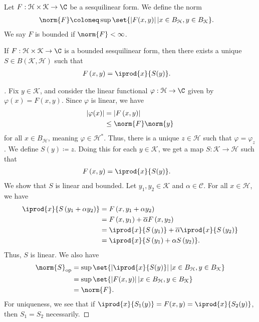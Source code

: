\documentclass[10pt]{mypackage}
\begin{document}
\begin{definition}
  Let $F: \mathcal{H}\times \mathcal{K}\rightarrow \C$ be a sesquilinear form. We define the norm
  \begin{align*}
    \norm{F} &\coloneq \sup\set{\left\vert F(x,y) \right\vert | x\in B_{\mathcal{H}},y\in B_{\mathcal{K}}}.
  \end{align*}
  We say $F$ is bounded if $\norm{F} < \infty $.
\end{definition}
\begin{proposition}
  If $F: \mathcal{H}\times \mathcal{K}\rightarrow \C$ is a bounded sesquilinear form, then there exists a unique $S\in B\left(\mathcal{K},\mathcal{H}\right)$ such that
  \begin{align*}
    F\left(x,y\right) &= \iprod{x}{S(y)}.
  \end{align*}
\end{proposition}
\begin{proof}[]
Fix $y\in \mathcal{K}$, and consider the linear functional $\varphi: \mathcal{H}\rightarrow \C$ given by $\varphi(x) = F\left(x,y\right)$. Since $\varphi$ is linear, we have
\begin{align*}
  \left\vert \varphi(x) \right\vert &= \left\vert F\left(x,y\right) \right\vert\\
                                    &\leq \norm{F}\norm{y}
\end{align*}
for all $x\in B_{\mathcal{H}}$, meaning $\varphi\in \mathcal{H}^{\ast}$. Thus, there is a unique $z\in \mathcal{H}$ such that $\varphi = \varphi_z$. We define $S(y) \coloneq z$. Doing this for each $y\in \mathcal{K}$, we get a map $S: \mathcal{K}\rightarrow \mathcal{H}$ such that
\begin{align*}
  F\left(x,y\right) &= \iprod{x}{S(y)}.
\end{align*}
We show that $S$ is linear and bounded. Let $y_1,y_2\in \mathcal{K}$ and $\alpha \in \mathcal{C}$. For all $x\in \mathcal{H}$, we have
\begin{align*}
  \iprod{x}{S\left(y_1 + \alpha y_2\right)} &= F\left(x,y_1 + \alpha y_2\right)\\
                                            &= F\left(x,y_1\right) + \overline{\alpha}F\left(x,y_2\right)\\
                                            &= \iprod{x}{S\left(y_1\right)} + \overline{\alpha} \iprod{x}{S\left(y_2\right)}\\
                                            &= \iprod{x}{S\left(y_1\right) + \alpha S\left(y_2\right)}.
\end{align*}
Thus, $S$ is linear. We also have
\begin{align*}
  \norm{S}_{\text{op}} &= \sup\set{\left\vert \iprod{x}{S(y)} \right\vert | x\in B_{\mathcal{H}},y\in B_{\mathcal{K}}}\\
                       &= \sup\set{\left\vert F(x,y) \right\vert | x\in B_{\mathcal{H}},y\in B_{\mathcal{K}}}\\
                       &= \norm{F}.
\end{align*}
For uniqueness, we see that if $ \iprod{x}{S_1(y)} = F(x,y) = \iprod{x}{S_2(y)} $, then $S_1 = S_2$ necessarily.
\end{proof}
\end{document}
